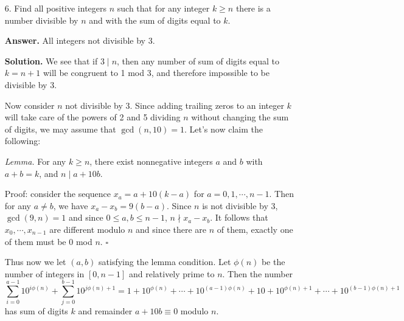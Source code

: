 \documentclass[11pt,a4paper]{article}
\begin{document}
\begin{enumerate}
    
    \item[6.]
    Find all positive integers $n$ such that for any integer $k \ge n$ there is a number divisible by
    $n$ and with the sum of digits equal to $k$.
    
    \textbf{Answer.} All integers not divisible by 3. 
    
    \textbf{Solution.} 
    We see that if $3\mid n$, then any number of sum of digits equal to $k=n+1$ will be congruent to 1 mod 3, and therefore impossible to be divisible by 3. 
    
    Now consider $n$ not divisible by 3. 
    Since adding trailing zeros to an integer $k$ will take care of the powers of 2 and 5 dividing $n$ without changing the sum of digits, 
    we may assume that $\gcd(n, 10)=1$. 
    Let's now claim the following: 
    
    \emph{Lemma.} For any $k\ge n$, there exist nonnegative integers $a$ and $b$ with $a+b=k$, and $n\mid a+10b$. 
    
    Proof: 
    consider the sequence $x_a = a + 10(k-a)$ for $a=0, 1, \cdots, n-1$. 
    Then for any $a\neq b$, we have $x_a-x_b = 9(b-a)$. Since $n$ is not divisible by 3, $\gcd(9, n)=1$ and since $0\le a, b\le n-1$, $n\nmid x_a-x_b$. 
    It follows that $x_0, \cdots, x_{n-1}$ are different modulo $n$ and since there are $n$ of them, 
    exactly one of them must be 0 mod $n$. $\square$
    
    Thus now we let $(a, b)$ satisfying the lemma condition. Let $\phi(n)$ be the number of integers in $[0, n-1]$ and relatively prime to $n$. 
    Then the number 
    \[
    \sum_{i=0}^{a-1} 10^{i\phi(n)}
    +\sum_{j=0}^{b-1} 10^{j\phi(n)+1}
    =
    1+10^{\phi(n)}+\cdots + 10^{(a-1)\phi(n)}
    +10+10^{\phi(n)+1}+\cdots + 10^{(b-1)\phi(n)+1}
    \]
    has sum of digits $k$ and remainder $a+10b\equiv 0$ modulo $n$. 

\end{enumerate}
\end{document}
